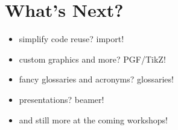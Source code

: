 \documentclass[titlepage, hidelinks, 12pt]{article}%
\begin{document}
    \section{What's Next?}
        \begin{itemize}
            \item simplify code reuse? import!
            \item custom graphics and more? PGF/TikZ!
            \item fancy glossaries and acronyms? glossaries!
            \item presentations? beamer!
            \item and still more at the coming workshops!
        \end{itemize}
    \clearpage
    \printbibliography[heading=bibintoc]
\end{document}
